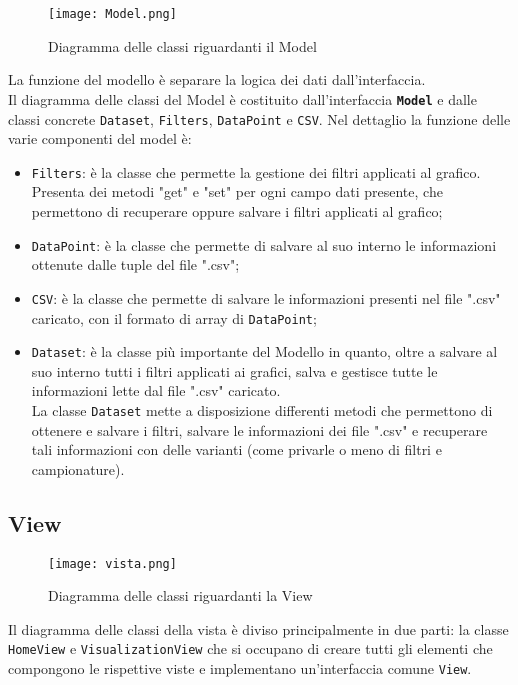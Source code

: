 \begin{figure}[H]
	\centering
	\texttt{[image: Model.png]}
	\caption{Diagramma delle classi riguardanti il Model}
  \end{figure}
La funzione del modello è separare la logica dei dati dall'interfaccia.\\
Il diagramma delle classi del Model è costituito dall'interfaccia \textbf{\texttt{Model}} e dalle classi concrete \texttt{Dataset}, \texttt{Filters}, \texttt{DataPoint} e \texttt{CSV}.
Nel dettaglio la funzione delle varie componenti del model è:
\begin{itemize}
	\item \texttt{Filters}: è la classe che permette la gestione dei filtri applicati al grafico. Presenta dei metodi "get" e "set" per ogni campo dati presente, che permettono di recuperare oppure salvare i filtri applicati al grafico;
	\item \texttt{DataPoint}: è la classe che permette di salvare al suo interno le informazioni ottenute dalle tuple del file ".csv";
	\item \texttt{CSV}: è la classe che permette di salvare le informazioni presenti nel file ".csv" caricato, con il formato di array di \texttt{DataPoint};
	\item \texttt{Dataset}: è la classe più importante del Modello in quanto, oltre a salvare al suo interno tutti i filtri applicati ai grafici, salva e gestisce tutte le informazioni lette dal file ".csv" caricato.\\ La classe \texttt{Dataset} mette a disposizione differenti metodi che permettono di ottenere e salvare i filtri, salvare le informazioni dei file ".csv" e recuperare tali informazioni con delle varianti (come privarle o meno di filtri e campionature).
\end{itemize}

\subsection{View}
\begin{figure}[H]
    \texttt{[image: vista.png]}
    \caption{Diagramma delle classi riguardanti la View}
\end{figure}
Il diagramma delle classi della vista è diviso principalmente in due parti: la classe \texttt{HomeView} e \texttt{VisualizationView} che si occupano di creare tutti gli elementi che compongono le rispettive viste e implementano un'interfaccia comune \texttt{View}.

